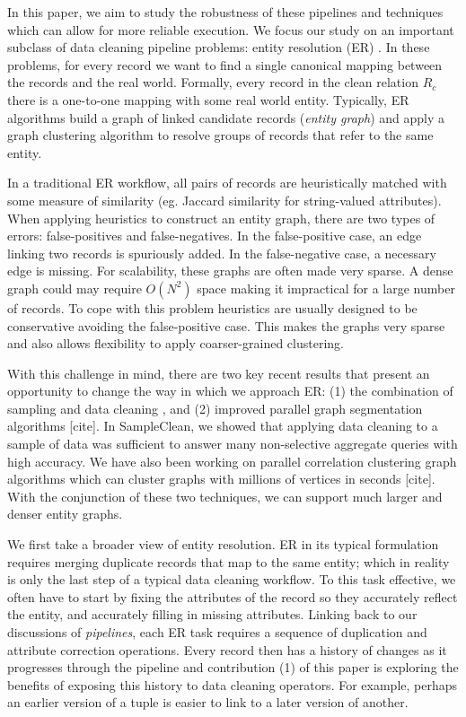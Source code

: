 In this paper, we aim to study the robustness of these pipelines and techniques which can allow for more reliable execution.
We focus our study on an important subclass of data cleaning pipeline problems: entity resolution (ER) \cite{DBLP:journals/pvldb/KopckeTR10, conf/dmkd/MongeE97, conf/sigmod/WhangMKTG09, conf/acl/FinkelM08, conf/sigmod/WangLF12, Fellegi1969, conf/sigmod/ArasuGK10, DBLP:journals/tkde/ElmagarmidIV07, journals/tkde/Christen11}. 
In these problems, for every record we want to find a single canonical mapping between the records and the real world.
Formally, every record in the clean relation $R_c$ there is a one-to-one mapping with some real world entity.
Typically, ER algorithms build a graph of linked candidate records (\emph{entity graph}) and apply a graph clustering algorithm to resolve groups of records that refer to the same entity.

In a traditional ER workflow, all pairs of records are heuristically matched with some measure of similarity (eg. Jaccard similarity for string-valued attributes).
When applying heuristics to construct an entity graph, there are two types of errors: false-positives and false-negatives. 
In the false-positive case, an edge linking two records is spuriously added. 
In the false-negative case, a necessary edge is missing. 
For scalability, these graphs are often made very sparse.
A dense graph could may require $O(N^2)$ space making it impractical for a large number of records.
To cope with this problem heuristics are usually designed to be conservative avoiding the false-positive case.
This makes the graphs very sparse and also allows flexibility to apply coarser-grained clustering.

With this challenge in mind, there are two key recent results that present an opportunity to change the way in which we approach ER: (1) the combination of sampling and data cleaning \cite{wang1999sample}, and (2) improved parallel graph segmentation algorithms [cite]. 
In SampleClean, we showed that applying data cleaning to a sample of data was sufficient to answer many non-selective aggregate queries with high accuracy. We have also been working on parallel correlation clustering graph algorithms which can cluster graphs with millions of vertices in seconds [cite].
With the conjunction of these two techniques, we can support much larger and denser entity graphs.

We first take a broader view of entity resolution.
ER in its typical formulation requires merging duplicate records that map to the same entity; which in reality is only the last step of a typical data cleaning workflow.
To this task effective, we often have to start by fixing the attributes of the record so they accurately reflect the entity, and accurately filling in missing attributes.
Linking back to our discussions of \emph{pipelines}, each ER task requires a sequence of duplication and attribute correction operations.
Every record then has a history of changes as it progresses through the pipeline and contribution (1) of this paper is exploring the benefits of exposing this history to data cleaning operators.
For example, perhaps an earlier version of a tuple is easier to link to a later version of another.

